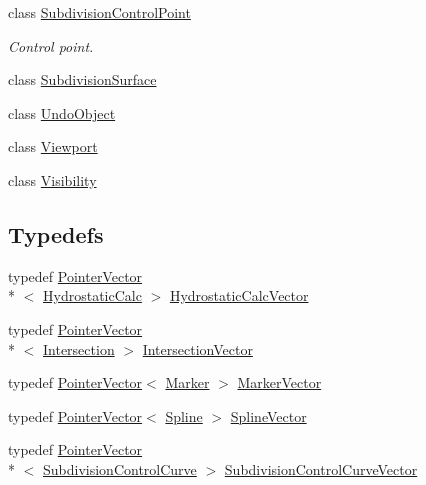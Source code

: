 \begin{DoxyCompactItemize}
class \hyperlink{classShipCAD_1_1SubdivisionControlPoint}{Subdivision\-Control\-Point}
\begin{DoxyCompactList}\small\item\em Control point. \end{DoxyCompactList}\item 
class \hyperlink{classShipCAD_1_1SubdivisionSurface}{Subdivision\-Surface}
\item 
class \hyperlink{classShipCAD_1_1UndoObject}{Undo\-Object}
\item 
class \hyperlink{classShipCAD_1_1Viewport}{Viewport}
\item 
class \hyperlink{classShipCAD_1_1Visibility}{Visibility}
\end{DoxyCompactItemize}
\subsection*{Typedefs}
\begin{DoxyCompactItemize}
\item 
typedef \hyperlink{classPointerVector}{Pointer\-Vector}\\*
$<$ \hyperlink{classShipCAD_1_1HydrostaticCalc}{Hydrostatic\-Calc} $>$ \hyperlink{namespaceShipCAD_a0c7b012d8868cbb43871cf0bf303ccc6}{Hydrostatic\-Calc\-Vector}
\item 
typedef \hyperlink{classPointerVector}{Pointer\-Vector}\\*
$<$ \hyperlink{classShipCAD_1_1Intersection}{Intersection} $>$ \hyperlink{namespaceShipCAD_a9910f0963197f9df6125398efd4fa139}{Intersection\-Vector}
\item 
typedef \hyperlink{classPointerVector}{Pointer\-Vector}$<$ \hyperlink{classShipCAD_1_1Marker}{Marker} $>$ \hyperlink{namespaceShipCAD_a36fff5b53986f6d6976afc749463ef22}{Marker\-Vector}
\item 
typedef \hyperlink{classPointerVector}{Pointer\-Vector}$<$ \hyperlink{classShipCAD_1_1Spline}{Spline} $>$ \hyperlink{namespaceShipCAD_a053b941b2c87049bb9380428d4d5a056}{Spline\-Vector}
\item 
typedef \hyperlink{classPointerVector}{Pointer\-Vector}\\*
$<$ \hyperlink{classShipCAD_1_1SubdivisionControlCurve}{Subdivision\-Control\-Curve} $>$ \hyperlink{namespaceShipCAD_aa9dd7a826ae5254e377dac43ea19da80}{Subdivision\-Control\-Curve\-Vector}
\end{DoxyCompactItemize}
